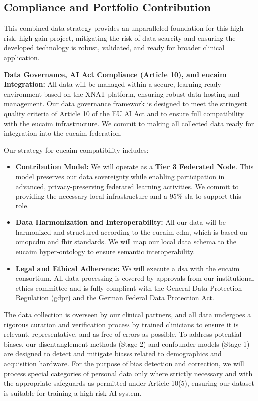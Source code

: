 \documentclass[11pt, a4paper]{article}
\begin{document}
\subsection{Compliance and Portfolio Contribution}
This combined data strategy provides an unparalleled foundation for this high-risk, high-gain project, mitigating the risk of data scarcity and ensuring the developed technology is robust, validated, and ready for broader clinical application.

\textbf{Data Governance, AI Act Compliance (Article 10), and \gls{eucaim} Integration:} All data will be managed within a secure, learning-ready environment based on the XNAT platform, ensuring robust data hosting and management. Our data governance framework is designed to meet the stringent quality criteria of Article 10 of the EU AI Act and to ensure full compatibility with the \gls{eucaim} infrastructure. We commit to making all collected data ready for integration into the \gls{eucaim} federation.

Our strategy for \gls{eucaim} compatibility includes:
\begin{itemize}
    \item \textbf{Contribution Model:} We will operate as a \textbf{Tier 3 Federated Node}. This model preserves our data sovereignty while enabling participation in advanced, privacy-preserving federated learning activities. We commit to providing the necessary local infrastructure and a 95\% \gls{sla} to support this role.
    \item \textbf{Data Harmonization and Interoperability:} All our data will be harmonized and structured according to the \gls{eucaim} \gls{cdm}, which is based on \gls{omopcdm} and \gls{fhir} standards. We will map our local data schema to the \gls{eucaim} hyper-ontology to ensure semantic interoperability.
    \item \textbf{Legal and Ethical Adherence:} We will execute a \gls{dsa} with the \gls{eucaim} consortium. All data processing is covered by approvals from our institutional ethics committee and is fully compliant with the General Data Protection Regulation (\gls{gdpr}) and the German Federal Data Protection Act.
\end{itemize}

The data collection is overseen by our clinical partners, and all data undergoes a rigorous curation and verification process by trained clinicians to ensure it is relevant, representative, and as free of errors as possible. To address potential biases, our disentanglement methods (Stage 2) and confounder models (Stage 1) are designed to detect and mitigate biases related to demographics and acquisition hardware. For the purpose of bias detection and correction, we will process special categories of personal data only where strictly necessary and with the appropriate safeguards as permitted under Article 10(5), ensuring our dataset is suitable for training a high-risk AI system.
\end{document}
